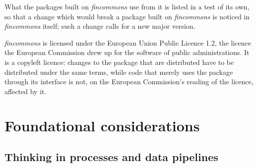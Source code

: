 \documentclass[a4paper, 11pt]{report}
\begin{document}
What the packages built on \emph{fincommons} use from it is listed in a test of its own, so that a change which would break a package built on \emph{fincommons} is noticed in \emph{fincommons} itself; such a change calls for a new major version.

\emph{fincommons} is licensed under the European Union Public Licence 1.2, the licence the European Commission drew up for the software of public administrations. It is a copyleft licence: changes to the package that are distributed have to be distributed under the same terms, while code that merely uses the package through its interface is not, on the European Commission's reading of the licence, affected by it.


\chapter{Foundational considerations}


\section{Thinking in processes and data pipelines\label{sec:intro-processes}}
\end{document}
